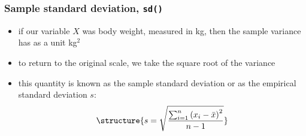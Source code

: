 \documentclass[extsize,handout,10pt]{beamer}\usepackage[]{graphicx}\usepackage[]{color}
\begin{document}
 
  \begin{frame}
    \frametitle{Sample standard deviation, \texttt{sd()}}
    \begin{itemize}
    \item<1-> if our variable $X$ was body weight, measured in kg,
      then the sample variance has as a unit kg$^2$
    \item to return to the original scale, we take the square root of
      the variance
    \item this quantity is known as the \alert{sample standard
        deviation} or as the \alert{empirical standard deviation} $s$:
      \begin{equation*}
        \structure{
          s=\sqrt{\frac{\sum_{i=1}^n{{(x_i-\bar{x})}^2}}{n-1}}}
        \label{Standardabweichung}
      \end{equation*}
    \end{itemize}
  \end{frame}
\end{document}
